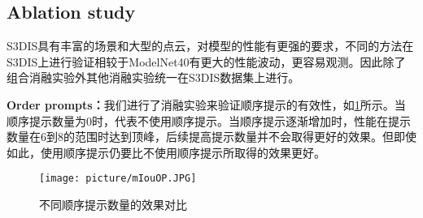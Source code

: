 \documentclass[preprint,12pt]{elsarticle}
\begin{document}
\subsection{Ablation study}
S3DIS具有丰富的场景和大型的点云，对模型的性能有更强的要求，不同的方法在S3DIS上进行验证相较于ModelNet40有更大的性能波动，更容易观测。因此除了组合消融实验外其他消融实验统一在S3DIS数据集上进行。

\label{subsec:Ablation}
\textbf{Order prompts：}我们进行了消融实验来验证顺序提示的有效性，如\cref{fig:mIouOP}所示。当顺序提示数量为0时，代表不使用顺序提示。当顺序提示逐渐增加时，性能在提示数量在6到8的范围时达到顶峰，后续提高提示数量并不会取得更好的效果。但即使如此，使用顺序提示仍要比不使用顺序提示所取得的效果更好。

\begin{figure}[htbp]
	\centering
	\texttt{[image: picture/mIouOP.JPG]}
	\caption{不同顺序提示数量的效果对比}
	\label{fig:mIouOP}
\end{figure}
\end{document}
